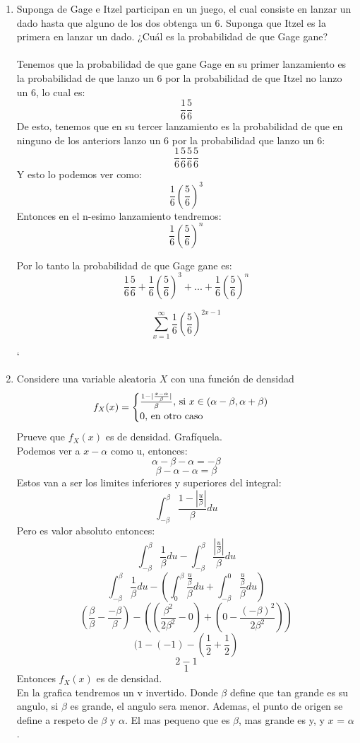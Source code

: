 \documentclass[12pt,a4paper]{report}
\begin{document}
	\begin{enumerate}
		\item{
			Suponga de Gage e Itzel participan en un juego, el cual consiste en
			lanzar un dado hasta que alguno de los dos obtenga un 6. Suponga
			que Itzel es la primera en lanzar un dado. ¿Cuál es la probabilidad
			de que Gage gane?
			\\ \\
	        Tenemos que la probabilidad de que gane Gage en su primer lanzamiento es la
		probabilidad de que lanzo un 6 por la probabilidad de que Itzel no lanzo un
		6, lo cual es:
	        \[\frac{1}{6}\frac{5}{6}\]
	        De esto, tenemos que en su tercer lanzamiento es la probabilidad de que en
		ninguno de los anteriors lanzo un 	6 por la probabilidad que lanzo  un 6:
	        \[\frac{1}{6}\frac{5}{6}\frac{5}{6}\frac{5}{6}\]
	        Y esto lo podemos ver como:
	        \[\frac{1}{6}(\frac{5}{6})^{3}\]
	        Entonces en el n-esimo lanzamiento tendremos:
	        \[\frac{1}{6}(\frac{5}{6})^{n}\]

	        Por lo tanto la probabilidad de que Gage gane es:
	        \[\frac{1}{6}\frac{5}{6} + \frac{1}{6}(\frac{5}{6})^{3} + ... + \frac{1}{6}(\frac{5}{6})^{n}\]

	        \[\sum^{\infty}_{x=1} \frac{1}{6}(\frac{5}{6})^{2x - 1}\]


	       `

		}
		\item{
			Considere una variable aleatoria $X$ con una función de densidad
			\[
				f_X(x) = \begin{cases}
					\frac{1-|\frac{x-\alpha}{\beta}|}{\beta},
					$ si $ x \in (\alpha - \beta, \alpha + \beta)\\
					0, $ en otro caso$
				\end{cases}
			\]
			Prueve que $f_X(x)$ es de densidad. Grafíquela.\\

			Podemos ver a $x - \alpha$ como u, entonces:
			\[\alpha - \beta - \alpha = -\beta\]
			\[\beta - \alpha - \alpha = \beta\]
			Estos van a ser los limites inferiores y superiores del integral:
    			\[\int^\beta_{-\beta}  \frac{1-|\frac{u}{\beta}|}{\beta}du\]
			Pero es valor absoluto entonces:
			\[\int^\beta_{-\beta} \frac{1}{\beta}du - \int^\beta_{-\beta} \frac{|\frac{u}{\beta}|}{\beta}du\]
			\[\int^\beta_{-\beta} \frac{1}{\beta}du -( \int^\beta_{0} \frac{\frac{u}{\beta}}{\beta}du + 				\int^0_{-\beta}  \frac{\frac{u}{\beta}}{\beta}du)\]
			\[(\frac{\beta}{\beta}-\frac{-\beta}{\beta}) - ((\frac{\beta^2}{2\beta^2} - 0)
			+ (0 - \frac{(-\beta)^2}{2\beta^2}))\]
			\[(1-(-1) - (\frac{1}{2} + \frac{1}{2})\]
			\[2-1\]
			\[1\]
			Entonces $f_X(x)$ es de densidad.\\
			En la grafica tendremos un v invertido. Donde $\beta$ define que tan grande es su angulo,
			si $\beta$ es grande, el angulo sera menor. Ademas, el punto de origen se define a
			respeto de $\beta$ y $\alpha$. El mas pequeno que es $\beta$, mas grande es y, y $x$
			= $\alpha$.
		}


\end{enumerate}
\end{document}
